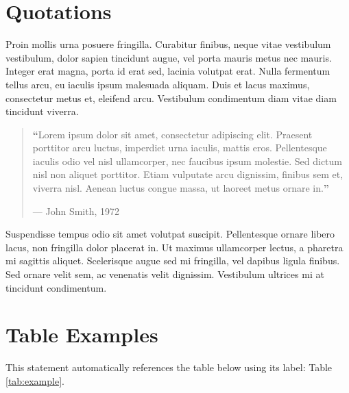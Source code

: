 \documentclass[
	a4paper, %
	12pt, %
]{include/CSSullivanBusinessReport}
\begin{document}
\section{Quotations}

Proin mollis urna posuere fringilla. Curabitur finibus, neque vitae vestibulum vestibulum, dolor sapien tincidunt augue, vel porta mauris metus nec mauris. Integer erat magna, porta id erat sed, lacinia volutpat erat. Nulla fermentum tellus arcu, eu iaculis ipsum malesuada aliquam. Duis et lacus maximus, consectetur metus et, eleifend arcu. Vestibulum condimentum diam vitae diam tincidunt viverra. %

\begin{quote}
	\textbf{\LARGE ``}Lorem ipsum dolor sit amet, consectetur adipiscing elit. Praesent porttitor arcu luctus, imperdiet urna iaculis, mattis eros. Pellentesque iaculis odio vel nisl ullamcorper, nec faucibus ipsum molestie. Sed dictum nisl non aliquet porttitor. Etiam vulputate arcu dignissim, finibus sem et, viverra nisl. Aenean luctus congue massa, ut laoreet metus ornare in.\textbf{''}
	
	\hfill--- John Smith, 1972
\end{quote}

Suspendisse tempus odio sit amet volutpat suscipit. Pellentesque ornare libero lacus, non fringilla dolor placerat in. Ut maximus ullamcorper lectus, a pharetra mi sagittis aliquet. Scelerisque augue sed mi fringilla, vel dapibus ligula finibus. Sed ornare velit sem, ac venenatis velit dignissim. Vestibulum ultrices mi at tincidunt condimentum.


\section{Table Examples}

This statement automatically references the table below using its label: Table \ref{tab:example}.
\end{document}
